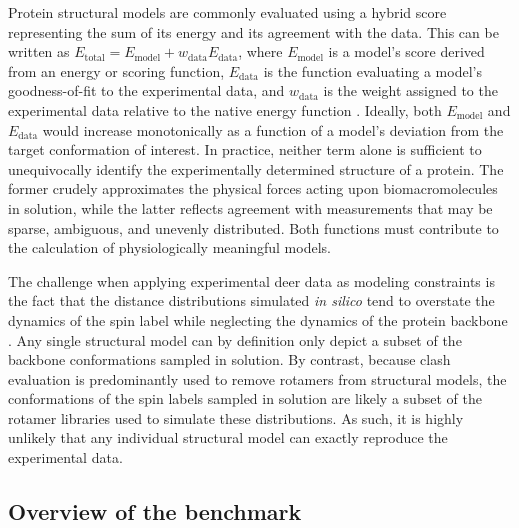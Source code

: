 Protein structural models are commonly evaluated using a hybrid score representing the sum of its energy and its agreement with the data. This can be written as $E_{\mathup{total}}=E_{\mathup{model}} + w_{\mathup{data}} E_{\mathup{data}}$, where $E_{\mathup{model}}$ is a model’s score derived from an energy or scoring function, $E_{\mathup{data}}$ is the function evaluating a model’s goodness-of-fit to the experimental data, and $w_{\mathup{data}}$ is the weight assigned to the experimental data relative to the native energy function \citep*{Adams1997, Jack1978}. Ideally, both $E_{\mathup{model}}$ and $E_{\mathup{data}}$ would increase monotonically as a function of a model’s deviation from the target conformation of interest. In practice, neither term alone is sufficient to unequivocally identify the experimentally determined structure of a protein. The former crudely approximates the physical forces acting upon biomacromolecules in solution, while the latter reflects agreement with measurements that may be sparse, ambiguous, and unevenly distributed. Both functions must contribute to the calculation of physiologically meaningful models.

The challenge when applying experimental \gls{deer} data as modeling constraints is the fact that the distance distributions simulated \emph{in silico} tend to overstate the dynamics of the spin label while neglecting the dynamics of the protein backbone \citep*{Hagelueken2012, Hatmal2012, Islam2013, Polyhach2011}. Any single structural model can by definition only depict a subset of the backbone conformations sampled in solution. By contrast, because clash evaluation is predominantly used to remove rotamers from structural models, the conformations of the spin labels sampled in solution are likely a subset of the rotamer libraries used to simulate these distributions. As such, it is highly unlikely that any individual structural model can exactly reproduce the experimental data.

\subsection{Overview of the benchmark}

